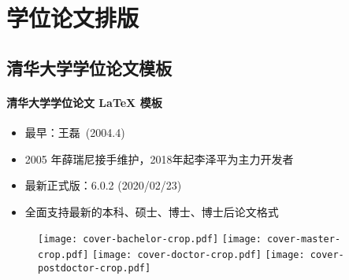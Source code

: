 
\section{学位论文排版}
\subsection{\ThuThesis 清华大学学位论文模板}

\begin{frame}{\ThuThesis}
  \framesubtitle{清华大学学位论文 \LaTeX{} 模板}
  \begin{itemize}
  \item 最早：王磊~(2004.4)
  \item 2005 年薛瑞尼接手维护，2018年起李泽平为主力开发者
  \item 最新正式版：6.0.2 (2020/02/23)
  \item 全面支持最新的本科、硕士、博士、博士后论文格式
  \end{itemize}
  \begin{figure}[htbp]
    \centering
    \texttt{[image: cover-bachelor-crop.pdf]}\hfill
    \texttt{[image: cover-master-crop.pdf]}\hfill
    \texttt{[image: cover-doctor-crop.pdf]}\hfill
    \texttt{[image: cover-postdoctor-crop.pdf]}
  \end{figure}
\end{frame}

